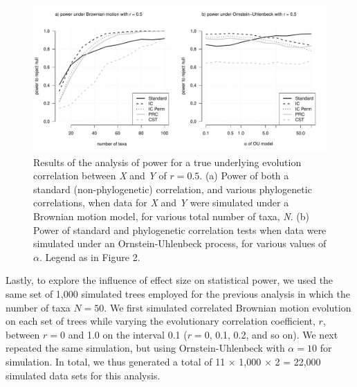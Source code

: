 \documentclass[fleqn,10pt,lineno]{wlpeerj} %
\begin{document}
\begin{figure}
\includegraphics[width=1\linewidth]{Harmon-and-Revell_NonParametricPCM.PeerJ_files/figure-latex/Harmon-fig3-1} \caption{Results of the analysis of power for a true underlying evolution correlation between \emph{X} and \emph{Y} of $r = 0.5$. (a) Power of both a standard (non-phylogenetic) correlation, and various phylogenetic correlations, when data for \emph{X} and \emph{Y} were simulated under a Brownian motion model, for various total number of taxa, \emph{N}. (b) Power of standard and phylogenetic correlation tests when data were simulated under an Ornstein-Uhlenbeck process, for various values of $\alpha$. Legend as in Figure 2.}\label{fig:Harmon-fig3}
\end{figure}

Lastly, to explore the influence of effect size on statistical power, we used the same set of 1,000 simulated trees employed for the previous analysis in which the number of taxa \(N = 50\). We first simulated correlated Brownian motion evolution on each set of trees while varying the evolutionary correlation coefficient, \(r\), between \(r = 0\) and 1.0 on the interval 0.1 (\(r = 0\), 0.1, 0.2, and so on). We next repeated the same simulation, but using Ornstein-Uhlenbeck with \(\alpha = 10\) for simulation. In total, we thus generated a total of 11 \(\times\) 1,000 \(\times\) 2 = 22,000 simulated data sets for this analysis.
\end{document}
